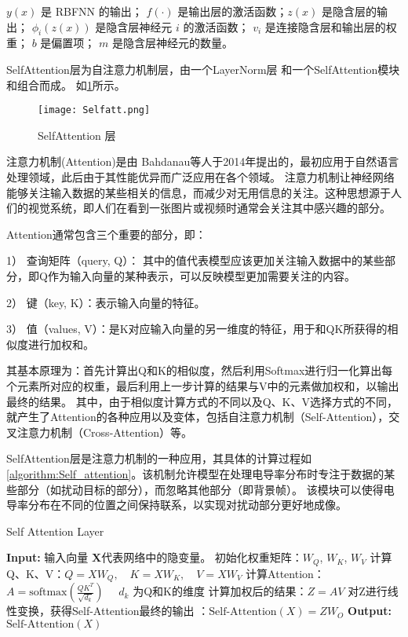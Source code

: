 $y(x)$ 是 RBFNN 的输出；
$f(\cdot)$ 是输出层的激活函数；$z(x)$ 是隐含层的输出；
$\phi_i(z(x))$ 是隐含层神经元 $i$ 的激活函数；
$v_i$ 是连接隐含层和输出层的权重；
$b$ 是偏置项；
$m$ 是隐含层神经元的数量。

SelfAttention层为自注意力机制层，由一个LayerNorm层 和一个SelfAttention模块和组合而成。
如\cref{figure:Selfatt}所示。
\begin{figure}[h]
    \centering
    \texttt{[image: Selfatt.png]}
    \caption{SelfAttention 层}
    \label{figure:Selfatt}
\end{figure}

注意力机制(Attention)是由 Bahdanau等人于2014年提出的\cite{2014Neural}，最初应用于自然语言处理领域，此后由于其性能优异而广泛应用在各个领域。
注意力机制让神经网络能够关注输入数据的某些相关的信息，而减少对无用信息的关注。这种思想源于人们的视觉系统，即人们在看到一张图片或视频时通常会关注其中感兴趣的部分。

Attention通常包含三个重要的部分，即：

  1） 查询矩阵（query, Q）： 其中的值代表模型应该更加关注输入数据中的某些部分，即Q作为输入向量的某种表示，可以反映模型更加需要关注的内容。
  
  2） 键（key, K）：表示输入向量的特征。

  3） 值（values, V）：是K对应输入向量的另一维度的特征，用于和QK所获得的相似度进行加权和。


其基本原理为：首先计算出Q和K的相似度，然后利用Softmax进行归一化算出每个元素所对应的权重，最后利用上一步计算的结果与V中的元素做加权和，以输出最终的结果。
其中，由于相似度计算方式的不同以及Q、K、V选择方式的不同，就产生了Attention的各种应用以及变体，包括自注意力机制（Self-Attention），交叉注意力机制（Cross-Attention）等。

SelfAttention层是注意力机制的一种应用，其具体的计算过程如\cref{algorithm:Self_attention}。该机制允许模型在处理电导率分布时专注于数据的某些部分（如扰动目标的部分），而忽略其他部分（即背景帧）。
该模块可以使得电导率分布在不同的位置之间保持联系，以实现对扰动部分更好地成像。

\begin{algorithm}

\caption{Self Attention Layer}
\begin{algorithmic}[1]
    \State \textbf{Input:} 输入向量 $\boldsymbol{X}$代表网络中的隐变量。
    \State 初始化权重矩阵：$W_Q$, $W_K$, $W_V$
    \State 计算Q、K、V：$Q = XW_Q, \quad K = XW_K, \quad V = XW_V$
    \State 计算Attention：$A = \text{softmax}\left(\frac{QK^T}{\sqrt{d_k}}\right) \quad $ $d_k$ 为Q和K的维度 
    \State 计算加权后的结果：$Z = AV$
    \State 对Z进行线性变换，获得Self-Attention最终的输出 ：$\text{Self-Attention}(X) = ZW_O$
    \State \textbf{Output:} $\text{Self-Attention}(X)$
\end{algorithmic}
\label{algorithm:Self_attention}
\end{algorithm}

